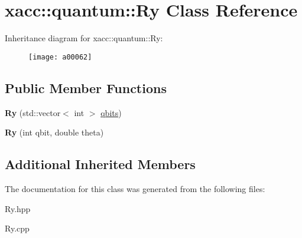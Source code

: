\hypertarget{a00062}{}\section{xacc\+:\+:quantum\+:\+:Ry Class Reference}
\label{a00062}
Inheritance diagram for xacc\+:\+:quantum\+:\+:Ry\+:\begin{figure}[H]
\begin{center}
\leavevmode
\texttt{[image: a00062]}
\end{center}
\end{figure}
\subsection*{Public Member Functions}
\begin{DoxyCompactItemize}
\item 
{\bfseries Ry} (std\+::vector$<$ int $>$ \hyperlink{a00033_a2a56be6c2519ea65df4d06f4abae1393}{qbits})\hypertarget{a00062_a542e1c0576a8e784f6cece4c77598486}{}\label{a00062_a542e1c0576a8e784f6cece4c77598486}

\item 
{\bfseries Ry} (int qbit, double theta)\hypertarget{a00062_a1cb81fe622168ba8d79fa2a78b5b0006}{}\label{a00062_a1cb81fe622168ba8d79fa2a78b5b0006}

\end{DoxyCompactItemize}
\subsection*{Additional Inherited Members}


The documentation for this class was generated from the following files\+:\begin{DoxyCompactItemize}
\item 
Ry.\+hpp\item 
Ry.\+cpp\end{DoxyCompactItemize}
